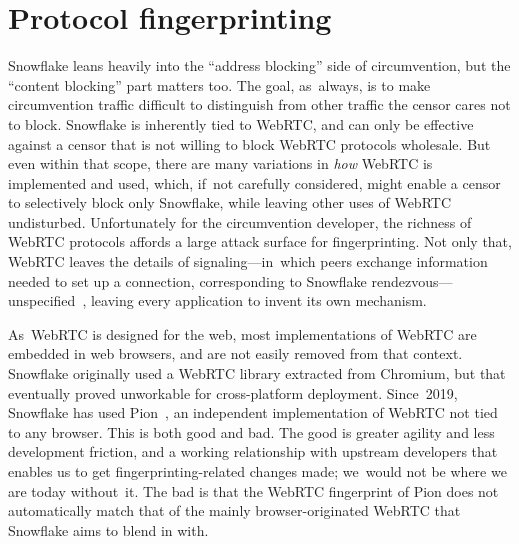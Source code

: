 \documentclass[letterpaper,twocolumn]{article}
\begin{document}
\section{Protocol fingerprinting}
\label{sec:fingerprinting}


Snowflake leans heavily into the ``address blocking'' side of circumvention,
but the ``content blocking'' part matters too.
The goal, as~always, is to make circumvention traffic
difficult to distinguish from other traffic the censor cares not to block.
Snowflake is inherently tied to WebRTC,
and can only be effective against a censor
that is not willing to block WebRTC protocols wholesale.
But even within that scope,
there are many variations in \emph{how}
WebRTC is implemented and used,
which, if~not carefully considered, might enable a censor
to selectively block only Snowflake,
while leaving other uses of WebRTC undisturbed.
Unfortunately for the circumvention developer,
the richness of WebRTC protocols
affords a large attack surface for fingerprinting.
Not only that, WebRTC leaves the details of
signaling---in~which peers exchange information
needed to set up a connection,
corresponding to Snowflake rendezvous---unspecified~\cite[\S 3]{rfc8825},
leaving every application to invent its own mechanism.

As~WebRTC is designed for the web,
most implementations of WebRTC are embedded in web browsers,
and are not easily removed from that context.
Snowflake originally used a WebRTC library extracted from Chromium,
but that eventually proved unworkable for cross-platform deployment.
Since~2019, Snowflake has used Pion~\cite{pion-webrtc},
an independent implementation of WebRTC
not tied to any browser.
This is both good and bad.
The good is greater agility and less development friction,
and a working relationship with upstream developers
that enables us to get fingerprinting-related changes made;
we~would not be where we are today without~it.
The bad is that the WebRTC fingerprint of Pion
does not automatically match that of the mainly browser-originated
WebRTC that Snowflake aims to blend in with.
\end{document}
